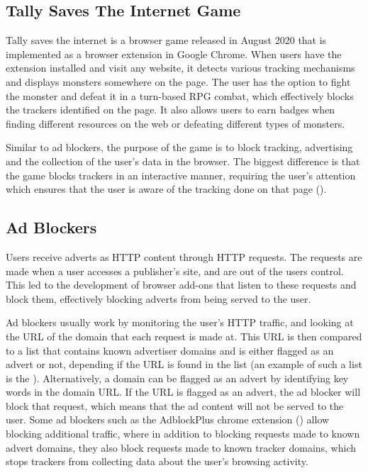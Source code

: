 \documentclass{l4proj}
\begin{document}
\subsection{Tally Saves The Internet Game}
Tally saves the internet is a browser game released in August 2020 that is implemented as a browser extension in Google Chrome. When users have the extension installed and visit any website, it detects various tracking mechanisms and displays monsters somewhere on the page. The user has the option to fight the monster and defeat it in a turn-based RPG combat, which effectively blocks the trackers identified on the page. It also allows users to earn badges when finding different resources on the web or defeating different types of monsters.

Similar to ad blockers, the purpose of the game is to block tracking, advertising and the collection of the user's data in the browser. The biggest difference is that the game blocks trackers in an interactive manner, requiring the user's attention which ensures that the user is aware of the tracking done on that page (\cite{tally}). 

\subsection{Ad Blockers}
Users receive adverts as HTTP content through HTTP requests. The requests are made when a user accesses a publisher's site, and are out of the users control. This led to the development of browser add-ons that listen to these requests and block them, effectively blocking adverts from being served to the user. 

Ad blockers usually work by monitoring the user's HTTP traffic, and looking at the URL of the domain that each request is made at. This URL is then compared to a list that contains known advertiser domains and is either flagged as an advert or not, depending if the URL is found in the list (an example of such a list is the \cite{easylist}). Alternatively, a domain can be flagged as an advert by identifying key words in the domain URL. If the URL is flagged as an advert, the ad blocker will block that request, which means that the ad content will not be served to the user. Some ad blockers such as the AdblockPlus chrome extension (\cite{adblock}) allow blocking additional traffic, where in addition to blocking requests made to known advert domains, they also block requests made to known tracker domains, which stops trackers from collecting data about the user's browsing activity.
\end{document}
